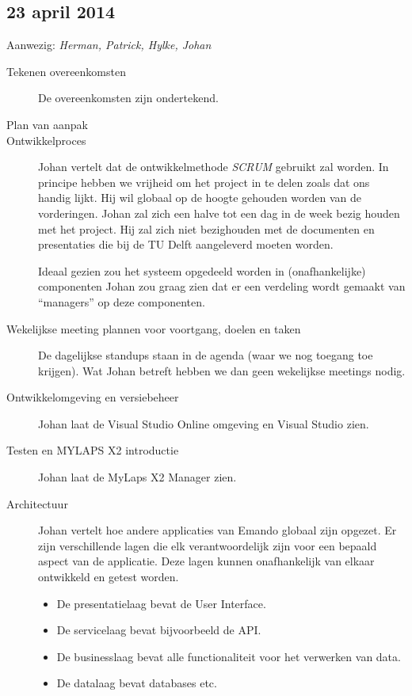 \subsection*{23 april 2014}
\label{sec:meeting-23-apr}

Aanwezig: \textit{Herman, Patrick, Hylke, Johan}

\begin{description}
\item[Tekenen overeenkomsten] De overeenkomsten zijn ondertekend.

\item[Plan van aanpak] 

\item[Ontwikkelproces] Johan vertelt dat de ontwikkelmethode \textit{SCRUM} gebruikt zal worden. In principe hebben we vrijheid om het project in te delen zoals dat ons handig lijkt. Hij wil globaal op de hoogte gehouden worden van de vorderingen. Johan zal zich een halve tot een dag in de week bezig houden met het project. Hij zal zich niet bezighouden met de documenten en presentaties die bij de TU Delft aangeleverd moeten worden.

Ideaal gezien zou het systeem opgedeeld worden in (onafhankelijke) componenten Johan zou graag zien dat er een verdeling wordt gemaakt van ``managers'' op deze componenten.

\item[Wekelijkse meeting plannen voor voortgang, doelen en taken] De dagelijkse standups staan in de agenda (waar we nog toegang toe krijgen). Wat Johan betreft hebben we dan geen wekelijkse meetings nodig.

\item[Ontwikkelomgeving en versiebeheer] Johan laat de Visual Studio Online omgeving en Visual Studio zien.

\item[Testen en MYLAPS X2 introductie] Johan laat de MyLaps X2 Manager zien.

\item[Architectuur] Johan vertelt hoe andere applicaties van Emando globaal zijn opgezet. Er zijn verschillende lagen die elk verantwoordelijk zijn voor een bepaald aspect van de applicatie. Deze lagen kunnen onafhankelijk van elkaar ontwikkeld en getest worden.

\begin{itemize}
  \item De presentatielaag bevat de User Interface.
  \item De servicelaag bevat bijvoorbeeld de API.
  \item De businesslaag bevat alle functionaliteit voor het verwerken van data.
  \item De datalaag bevat databases etc.
\end{itemize}

\end{description}

